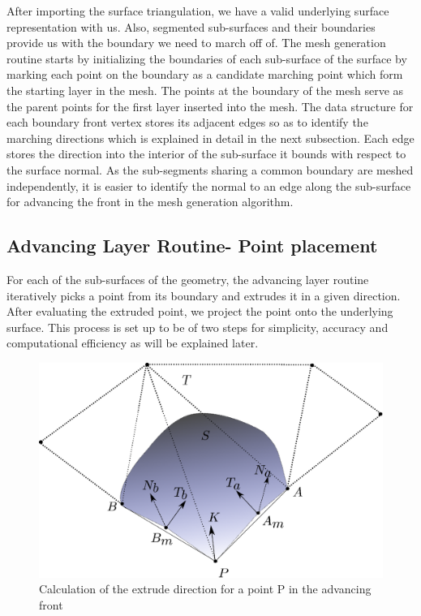 \documentclass[conf]{new-aiaa}
\begin{document}
After importing the surface triangulation, we have a valid underlying surface representation with us. Also, segmented sub-surfaces and their boundaries provide us with the boundary we need to march off of. The mesh generation routine starts by initializing the boundaries of each sub-surface of the surface by marking each point on the boundary as a candidate marching point which form the starting layer in the mesh. The points at the boundary of the mesh serve as the parent points for the first layer inserted into the mesh. The data structure for each boundary front vertex stores its adjacent edges so as to identify the marching directions which is explained in detail in the next subsection. Each edge stores the direction into the interior of the sub-surface it bounds with respect to the surface normal. As the sub-segments sharing a common boundary are meshed independently, it is easier to identify the normal to an edge along the sub-surface for advancing the front in the mesh generation algorithm.

\subsection{Advancing Layer Routine- Point placement} \label{advancing-layer}

For each of the sub-surfaces of the geometry, the advancing layer routine iteratively picks a point from its boundary and extrudes it in a given direction. After evaluating the extruded point, we project the point onto the underlying surface. This process is set up to be of two steps for simplicity, accuracy and computational efficiency as will be explained later.

\begin{figure}[hbt!]
\centering
\includegraphics[width=.5\textwidth]{drawing-extrude-direction.eps}
\caption{Calculation of the extrude direction for a point P in the advancing front}
\label{extrude-direction}
\end{figure}
\end{document}
